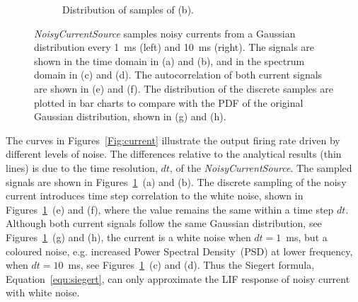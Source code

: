 \begin{figure}[tbp!]
\begin{subfigure}[t]{0.43\textwidth}
			\caption{Distribution of samples of (b).}
		\end{subfigure}
		\DIFdelbeginFL %
\DIFdelendFL \DIFaddbeginFL \caption[\textit{NoisyCurrentSource} samples from a Gaussian distribution.]{\DIFaddendFL \textit{NoisyCurrentSource} samples noisy currents from a Gaussian distribution every 1~ms (left) and 10~ms (right). The signals are shown in the time domain in (a) and (b), and in the spectrum domain in (c) and (d). The autocorrelation of both current signals are shown in (e) and (f). The distribution of the discrete samples are plotted in bar charts to compare with the PDF of the original Gaussian distribution, shown in (g) and (h).}
		\label{Fig:lif_curr}
	\end{figure}

	The curves in Figures~\ref{Fig:current} illustrate the output firing rate driven by different levels of noise.
	The differences relative to the analytical results (thin lines) is due to the time resolution, $dt$, of the \textit{NoisyCurrentSource}.
	The sampled signals are shown in Figures~\ref{Fig:lif_curr}~(a) and (b).
	The discrete sampling of the noisy current introduces time step correlation to the white noise, shown in Figures~\ref{Fig:lif_curr}~(e) and (f), where the value remains the same within a time step $dt$.
	Although both current signals follow the same Gaussian distribution, see Figures~\ref{Fig:lif_curr}~(g) and (h), the current is a white noise when $dt=1$~ms, but a coloured noise, e.g. increased Power Spectral Density~(PSD) at lower frequency, when $dt=10$~ms, see Figures~\ref{Fig:lif_curr}~(c) and (d).
	Thus the Siegert formula, Equation~\ref{equ:siegert}, can only approximate the LIF response of noisy current with white noise.
